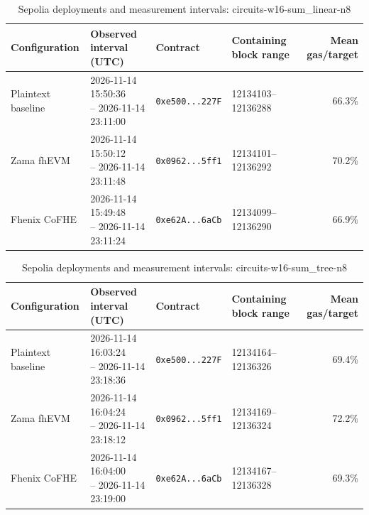 \begin{table}[!t]
\caption{Sepolia deployments and measurement intervals: circuits-w16-sum\_linear-n8}
\label{tab:sepolia-circuits-w16-sum-linear-n8}
\centering
\footnotesize
\setlength{\tabcolsep}{4pt}
\begin{tabular}{|l|l|l|l|r|}
\hline
\textbf{Configuration} & \textbf{Observed interval (UTC)} & \textbf{Contract} & \textbf{Containing block range} & \textbf{Mean gas/target} \\
\hline
Plaintext baseline & \shortstack[l]{2026-11-14 15:50:36 \\ -- 2026-11-14 23:11:00} & \texttt{0xe500...227F} & 12134103--12136288 & 66.3\% \\
\hline
Zama fhEVM & \shortstack[l]{2026-11-14 15:50:12 \\ -- 2026-11-14 23:11:48} & \texttt{0x0962...5ff1} & 12134101--12136292 & 70.2\% \\
\hline
Fhenix CoFHE & \shortstack[l]{2026-11-14 15:49:48 \\ -- 2026-11-14 23:11:24} & \texttt{0xe62A...6aCb} & 12134099--12136290 & 66.9\% \\
\hline
\end{tabular}
\end{table}

\begin{table}[!t]
\caption{Sepolia deployments and measurement intervals: circuits-w16-sum\_tree-n8}
\label{tab:sepolia-circuits-w16-sum-tree-n8}
\centering
\footnotesize
\setlength{\tabcolsep}{4pt}
\begin{tabular}{|l|l|l|l|r|}
\hline
\textbf{Configuration} & \textbf{Observed interval (UTC)} & \textbf{Contract} & \textbf{Containing block range} & \textbf{Mean gas/target} \\
\hline
Plaintext baseline & \shortstack[l]{2026-11-14 16:03:24 \\ -- 2026-11-14 23:18:36} & \texttt{0xe500...227F} & 12134164--12136326 & 69.4\% \\
\hline
Zama fhEVM & \shortstack[l]{2026-11-14 16:04:24 \\ -- 2026-11-14 23:18:12} & \texttt{0x0962...5ff1} & 12134169--12136324 & 72.2\% \\
\hline
Fhenix CoFHE & \shortstack[l]{2026-11-14 16:04:00 \\ -- 2026-11-14 23:19:00} & \texttt{0xe62A...6aCb} & 12134167--12136328 & 69.3\% \\
\hline
\end{tabular}
\end{table}

